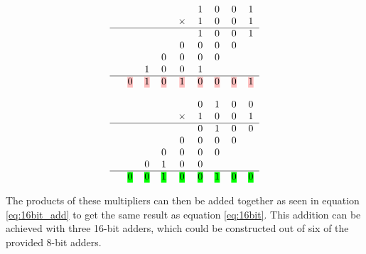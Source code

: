 \documentclass[11pt]{article}
\newcommand{\hlc}[2][yellow]{{%
    \colorlet{foo}{#1}%
    \sethlcolor{foo}\hl{#2}}%
}
\begin{document}
\begin{minipage}{.5\linewidth}
    \begin{equation}
        \label{eq:pink}
        \begin{tabular}{c c c c c c c c c }
            &   &   &   &   & 1 & 0 & 0 & 1 \\
            &   &   &   &  $\times$ & 1 & 0 & 0 & 1 \\
            \hline
            &   &   &   &   & 1 & 0 & 0 & 1 \\
            &   &   &   & 0 & 0 & 0 & 0 &   \\
            &   &   & 0 & 0 & 0 & 0 &   &   \\
            &   & 1 & 0 & 0 & 1 &   &   &   \\
            \hline
            & \hlc[pink]{0} & \hlc[pink]{1} & \hlc[pink]{0} & \hlc[pink]{1} & \hlc[pink]{0} & \hlc[pink]{0} & \hlc[pink]{0} & \hlc[pink]{1} \\
        \end{tabular} 
    \end{equation}
    \end{minipage}%
    \begin{minipage}{.5\linewidth}
        \begin{equation}
            \label{eq:green}
            \begin{tabular}{c c c c c c c c c }
                &   &   &   &   & 0 & 1 & 0 & 0 \\
                &   &   &   &  $\times$ & 1 & 0 & 0 & 1 \\
                \hline
                &   &   &   &   & 0 & 1 & 0 & 0 \\
                &   &   &   & 0 & 0 & 0 & 0 &   \\
                &   &   & 0 & 0 & 0 & 0 &   &   \\
                &   & 0 & 1 & 0 & 0 &   &   &   \\
                \hline
                & \hlc[green]{0} & \hlc[green]{0} & \hlc[green]{1} & \hlc[green]{0} & \hlc[green]{0} & \hlc[green]{1} & \hlc[green]{0} & \hlc[green]{0} \\
            \end{tabular} 
        \end{equation}
\end{minipage}

The products of these multipliers can then be added together as seen in equation \ref{eq:16bit_add} to get the same result as equation \ref{eq:16bit}.
This addition can be achieved with three 16-bit adders, which could be constructed out of six of the provided 8-bit adders.
\end{document}
